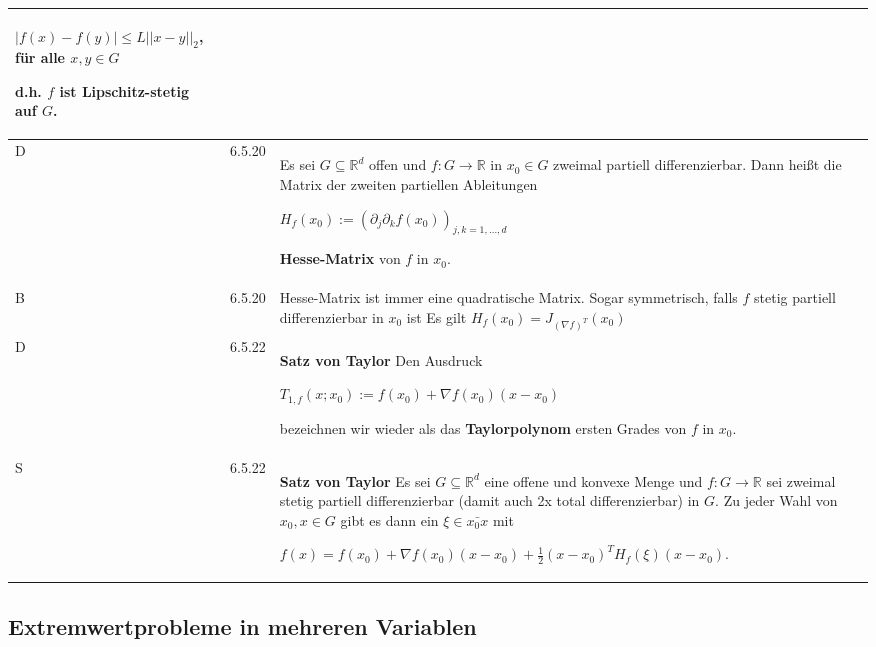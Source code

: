 \begin{longtable}{p{0.75cm} p{1cm} p{16cm}}
                        \centerline{$ |f(x) - f(y)| \leq L||x-y||_2 $, für alle $x,y \in G$}
                        d.h. $f$ ist \textbf{Lipschitz-stetig} auf $G$. \\
        \midrule
        D   & 6.5.20&   Es sei $G \subseteq \mathbb{R}^d$ offen und $f: G \rightarrow \mathbb{R}$ in $x_0 \in G$ zweimal partiell differenzierbar.
                        Dann heißt die Matrix der zweiten partiellen Ableitungen \hfill \break
                        \centerline{$ H_f(x_0) := (\partial_j \partial_k f(x_0))_{j,k = 1,\dots,d} $}
                        \textbf{Hesse-Matrix} von $f$ in $x_0$. \\
        \midrule
        B   & 6.5.20&   Hesse-Matrix ist immer eine quadratische Matrix. \hfill \break
                        Sogar symmetrisch, falls $f$ stetig partiell differenzierbar in $x_0$ ist \hfill \break
                        Es gilt $H_f(x_0) = J_{(\nabla f)^T}(x_0)$  \\
        \midrule
        D   & 6.5.22&   \textbf{Satz von Taylor} \hfill \break
                        Den Ausdruck \hfill \break
                        \centerline{$ T_{1,f}(x;x_0) := f(x_0) + \nabla f(x_0)(x-x_0) $}
                        bezeichnen wir wieder als das \textbf{Taylorpolynom} ersten Grades von $f$ in $x_0$. \\
        \midrule
        S   & 6.5.22&   \textbf{Satz von Taylor} \hfill \break
                        Es sei $G \subseteq \mathbb{R}^d$ eine offene und konvexe Menge und $f: G \rightarrow \mathbb{R}$ sei zweimal
                        stetig partiell differenzierbar (damit auch 2x total differenzierbar) in $G$. Zu jeder Wahl von
                        $x_0, x \in G$ gibt es dann ein $\xi \in \bar{x_0x}$ mit \hfill \break
                        \centerline{$ f(x) = f(x_0) + \nabla f(x_0)(x-x_0) + \frac{1}{2} (x-x_0)^T H_f(\xi)(x-x_0)$.} \\
        \bottomrule

    \end{longtable}

\subsection{Extremwertprobleme in mehreren Variablen}

